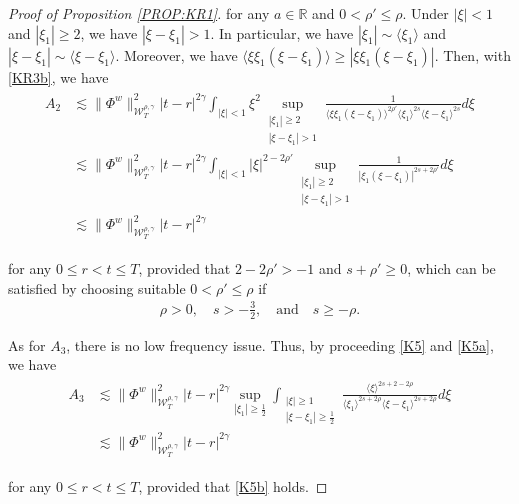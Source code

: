 \documentclass[letterpaper, 11pt,  reqno]{amsart}
\DeclareMathOperator*{\intt}{\int}
\newcommand{\1}{\hspace{0.5mm}\text{I}\hspace{0.5mm}}
\newcommand{\noi}{\noindent}
\newcommand{\R}{\mathbb{R}}
\newcommand{\g}{\gamma}
\newcommand{\les}{\lesssim}
\newcommand{\jb}[1]
{\langle #1 \rangle}
\newcommand{\W}{\mathcal{W}}
\numberwithin{equation}{section}
\numberwithin{theorem}{section}
\begin{document}
\begin{proof}[Proof of Proposition \ref{PROP:KR1}]
\noi
 for any $a\in \R$
and 
 $0<\rho'\le\rho$.
Under $|\xi| < 1$ and $|\xi_1|\ge 2$, 
we have $|\xi - \xi_1|> 1$.
In particular, we have $|\xi_1|\sim \jb{\xi_1}$
and $|\xi - \xi_1|\sim \jb{\xi- \xi_1}$.
Moreover, 
we have 
$\jb{\xi\xi_1(\xi-\xi_1)}\ge
 |\xi \xi_1(\xi- \xi_1)|$.
Then, with \eqref{KR3b}, we have
\begin{align}
\begin{split}
A_2
& \les
\|\Phi^w\|_{\W^{\rho,\g}_T}^2
|t-r|^{2\g}
\intt_{|\xi|<1}  \xi^2 
\sup_{\substack{|\xi_1|\ge 2\\|\xi - \xi_1|> 1}}
\frac{1}{\jb {\xi \xi_1 (\xi-\xi_1)}^{2\rho'}\jb {\xi_1}^{2s} \jb {\xi-\xi_1}^{2s}} d\xi
\\
& \les 
\|\Phi^w\|_{\W^{\rho,\g}_T}^2
|t-r|^{2\g}
\intt_{|\xi|<1} |\xi|^{2-2\rho' } 
\sup_{\substack{|\xi_1|\ge 2\\|\xi - \xi_1|> 1}}
\frac{1}{| \xi_1 (\xi-\xi_1)|^{2s+2\rho'} } d\xi\\
& \les 
\|\Phi^w\|_{\W^{\rho,\g}_T}^2
|t-r|^{2\g} 
\end{split}
\label{KR3c}
\end{align}



\noi
for any $0 \le r <  t \le T$, 
provided that $2-2\rho'>-1$ and $ s+\rho' \ge 0$, 
which can be satisfied by choosing 
suitable $0 < \rho' \le \rho$
if 
\begin{align}
\rho > 0, \quad s > -\frac 32,
\quad \text{and} \quad  
s\ge -\rho.
\label{KR3d}
\end{align}






As for $A_3$, 
there is no low frequency issue.
Thus, by 
proceeding \eqref{K5} and \eqref{K5a}, we have
\begin{align}
\begin{aligned}
A_3
& \les
\|\Phi^w\|^2_{\W_T^{\rho,\g}}|t-r |^{2\g}
\sup_{|\xi_1|\ge \frac 12}
\intt_{\substack{|\xi|\ge 1\\|\xi-\xi_1|\ge \frac 12 }}
\frac{ \jb{\xi}^{2s+2-2\rho}}{\jb{\xi_1}^{2s+2\rho}\jb{\xi - \xi_1}^{2s+2\rho}} d\xi\\
& \les
\|\Phi^w\|^2_{\W_T^{\rho,\g}}|t-r |^{2\g}
\end{aligned}
\label{KR4}
\end{align}

\noi
for any $0 \le r <  t \le T$, 
provided that
\eqref{K5b} holds.


\end{proof}
\end{document}
